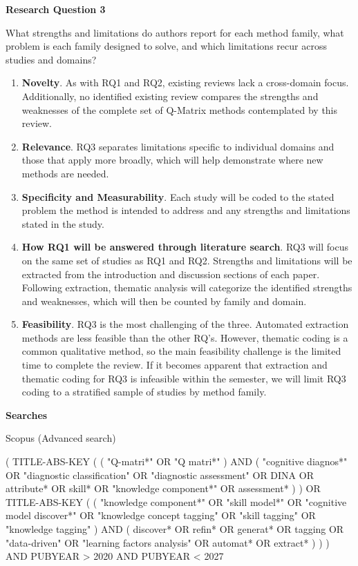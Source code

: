\documentclass[sigconf]{acmart}
\begin{document}
\textbf{Research Question 3}

What strengths and limitations do authors report for each method family, what problem is each family designed to solve, and which limitations recur across studies and domains?

\begin{enumerate}
    \item \textbf{Novelty}. As with RQ1 and RQ2, existing reviews lack a cross-domain focus. Additionally, no identified existing review compares the strengths and weaknesses of the complete set of Q-Matrix methods contemplated by this review.
    \item \textbf{Relevance}. RQ3 separates limitations specific to individual domains and those that apply more broadly, which will help demonstrate where new methods are needed.
    \item \textbf{Specificity and Measurability}. Each study will be coded to the stated problem the method is intended to address and any strengths and limitations stated in the study. 
    \item \textbf{How RQ1 will be answered through literature search}. RQ3 will focus on the same set of studies as RQ1 and RQ2. Strengths and limitations will be extracted from the introduction and discussion sections of each paper. Following extraction, thematic analysis will categorize the identified strengths and weaknesses, which will then be counted by family and domain.
    \item \textbf{Feasibility}. RQ3 is the most challenging of the three. Automated extraction methods are less feasible than the other RQ’s. However, thematic coding is a common qualitative method, so the main feasibility challenge is the limited time to complete the review. If it becomes apparent that extraction and thematic coding for RQ3 is infeasible within the semester, we will limit RQ3 coding to a stratified sample of studies by method family. 
\end{enumerate}

\textbf{Searches}

Scopus (Advanced search)

( TITLE-ABS-KEY ( ( "Q-matri*" OR "Q matri*" ) AND ( "cognitive diagnos*" OR "diagnostic classification" OR "diagnostic assessment" OR DINA OR attribute* OR skill* OR "knowledge component*" OR assessment* ) ) OR TITLE-ABS-KEY ( ( "knowledge component*" OR "skill model*" OR "cognitive model discover*" OR "knowledge concept tagging" OR "skill tagging" OR "knowledge tagging" ) AND ( discover* OR refin* OR generat* OR tagging OR "data-driven" OR "learning factors analysis" OR automat* OR extract* ) ) ) AND PUBYEAR > 2020 AND PUBYEAR < 2027
\end{document}
